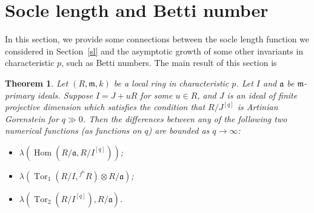 \documentclass[draft]{amsart}
\newtheorem{theorem}{Theorem}[section]
\theoremstyle{definition}
\numberwithin{equation}{theorem}
\begin{document}
 
\section{Socle length and Betti number}\label{betti}
 In this section, we provide some connections between the socle length function we considered in Section~\ref{sl} and the asymptotic growth of some other invariants in characteristic $p$, such as Betti numbers. The main result of this section is 
 \begin{theorem}\label{same}
 Let $(R, {\mathfrak{m}}, k)$ be a local ring in characteristic $p$. Let $I$ and ${\mathfrak{a}}$ be  ${\mathfrak{m}}$-primary ideals. Suppose $I=J+uR$ for some $u \in R$, and $J$ is an ideal of finite projective dimension which satisfies the condition that $R/J^{[q]}$ is Artinian Gorenstein for $q \gg0$. Then the differences between any of the following two numerical functions (as functions on $q$) are bounded as $q \to {{\infty}}$:
\begin{itemize}
\item[(1)] $\lambda ({\mathop{\mathrm{Hom}}\nolimits}(R/{\mathfrak{a}}, R/I^{[q]}))$;
\item[(2)] $\lambda ({\mathop{\mathrm{Tor}}\nolimits}_1(R/I, {}^{f^n}\!\! R)\otimes R/ {\mathfrak{a}})$;
\item[(3)] $\lambda ({\mathop{\mathrm{Tor}}\nolimits}_2(R/I^{[q]}),R/ {\mathfrak{a}})$.
\end{itemize} 
\end{theorem}
\end{document}
